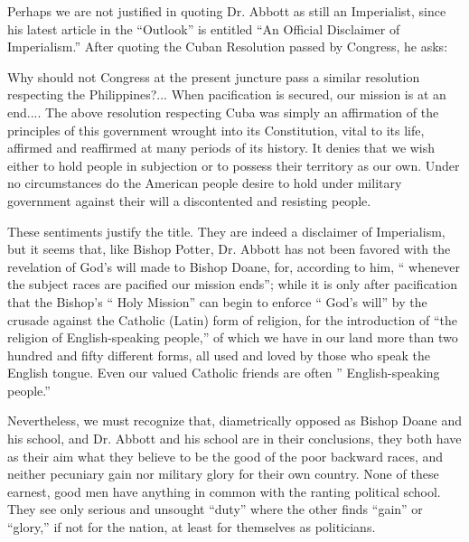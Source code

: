 \documentclass[11pt,openany]{book}
\begin{document}
Perhaps we are not justified in quoting Dr. Abbott as still an Imperialist, since his latest article in the ``Outlook'' is entitled ``An Official Disclaimer of Imperialism.'' After quoting the Cuban Resolution passed by Congress, he asks:

Why should not Congress at the present juncture pass a similar resolution respecting the Philippines?... When pacification is secured, our mission is at an end.... The above resolution respecting Cuba was simply an affirmation of the principles of this government wrought into its Constitution, vital to its life, affirmed and reaffirmed at many periods of its history. It denies that we wish either to hold people in subjection or to possess their territory as our own. Under no circumstances do the American people desire to hold under military government against their will a discontented and resisting people.

These sentiments justify the title. They are indeed a disclaimer of Imperialism, but it seems that, like Bishop Potter, Dr. Abbott has not been favored with the revelation of God's will made to Bishop Doane, for, according to him, `` whenever the subject races are pacified our mission ends''; while it is only after pacification that the Bishop's `` Holy Mission'' can begin to enforce `` God's will'' by the crusade against the Catholic (Latin) form of religion, for the introduction of ``the religion of English-speaking people,'' of which we have in our land more than two hundred and fifty different forms, all used and loved by those who speak the English tongue. Even our valued Catholic friends are often '' English-speaking people.''

Nevertheless, we must recognize that, diametrically opposed as Bishop Doane and his school, and Dr. Abbott and his school are in their conclusions, they both have as their aim what they believe to be the good of the poor backward races, and neither pecuniary gain nor military glory for their own country. None of these earnest, good men have anything in common with the ranting political school. They see only serious and unsought ``duty'' where the other finds ``gain'' or ``glory,'' if not for the nation, at least for themselves as politicians.
\end{document}
